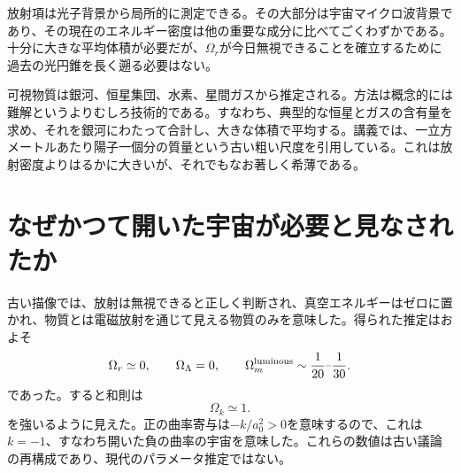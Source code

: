 \begin{classroomqa}
\end{classroomqa}

放射項は光子背景から局所的に測定できる。その大部分は宇宙マイクロ波背景であり、その現在のエネルギー密度は他の重要な成分に比べてごくわずかである。十分に大きな平均体積が必要だが、\(\Omega_r\)が今日無視できることを確立するために過去の光円錐を長く遡る必要はない。

可視物質は銀河、恒星集団、水素、星間ガスから推定される。方法は概念的には難解というよりむしろ技術的である。すなわち、典型的な恒星とガスの含有量を求め、それを銀河にわたって合計し、大きな体積で平均する。講義では、一立方メートルあたり陽子一個分の質量という古い粗い尺度を引用している。これは放射密度よりはるかに大きいが、それでもなお著しく希薄である。

\begin{classroomqa}
\end{classroomqa}

\section{なぜかつて開いた宇宙が必要と見なされたか}

古い描像では、放射は無視できると正しく判断され、真空エネルギーはゼロに置かれ、物質とは電磁放射を通じて見える物質のみを意味した。得られた推定はおよそ
\begin{equation}
\Omega_r\simeq0,
\qquad
\Omega_\Lambda=0,
\qquad
\Omega_m^{\rm luminous}\sim\frac{1}{20}\text{--}\frac{1}{30}.
\end{equation}
であった。すると和則は
\begin{equation}
\Omega_k\simeq1.
\end{equation}
を強いるように見えた。正の曲率寄与は\(-k/a_0^2>0\)を意味するので、これは\(k=-1\)、すなわち開いた負の曲率の宇宙を意味した。これらの数値は古い議論の再構成であり、現代のパラメータ推定ではない。

